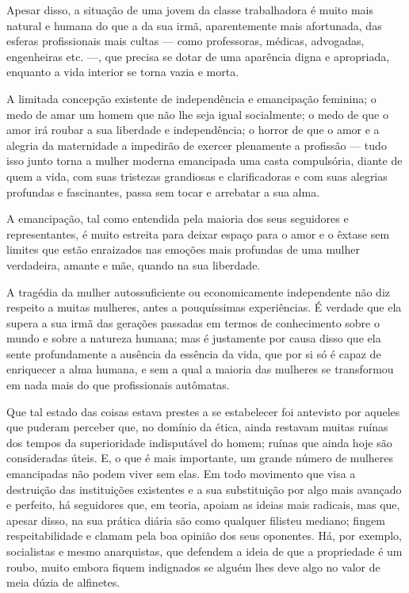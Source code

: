 Apesar disso, a situação de uma jovem da classe trabalhadora é muito
mais natural e humana do que a da sua irmã, aparentemente mais
afortunada, das esferas profissionais mais cultas --- como professoras, médicas, advogadas, engenheiras etc. ---,
que precisa se dotar de uma aparência digna e apropriada, enquanto a
vida interior se torna vazia e morta.

A limitada concepção existente de independência e emancipação feminina;
o medo de amar um homem que não lhe seja igual socialmente; o medo de
que o amor irá roubar a sua liberdade e independência; o horror de que o
amor e a alegria da maternidade a impedirão de exercer plenamente a
profissão --- tudo isso junto torna a mulher moderna emancipada uma casta
compulsória, diante de quem a vida, com suas tristezas grandiosas e
clarificadoras e com suas alegrias profundas e fascinantes, passa sem
tocar e arrebatar a sua alma.

A emancipação, tal como entendida pela maioria dos seus seguidores e
representantes, é muito estreita para deixar espaço para o amor e o
êxtase sem limites que estão enraizados nas emoções mais profundas de
uma mulher verdadeira, amante e mãe, quando na sua liberdade.

A tragédia da mulher autossuficiente ou economicamente independente não
diz respeito a muitas mulheres, antes a pouquíssimas experiências. É
verdade que ela supera a sua irmã das gerações passadas em termos de
conhecimento sobre o mundo e sobre a natureza humana; mas é justamente
por causa disso que ela sente profundamente a ausência da essência da
vida, que por si só é capaz de enriquecer a alma humana, e sem a qual a
maioria das mulheres se transformou em nada mais do que profissionais
autômatas.

Que tal estado das coisas estava prestes a se estabelecer foi antevisto
por aqueles que puderam perceber que, no domínio da ética, ainda
restavam muitas ruínas dos tempos da superioridade indisputável do
homem; ruínas que ainda hoje são consideradas úteis. E, o que é mais
importante, um grande número de mulheres emancipadas não podem viver sem
elas. Em todo movimento que visa a destruição das instituições
existentes e a sua substituição por algo mais avançado e perfeito, há
seguidores que, em teoria, apoiam as ideias mais radicais, mas que,
apesar disso, na sua prática diária são como qualquer filisteu mediano;
fingem respeitabilidade e clamam pela boa opinião dos seus oponentes.
Há, por exemplo, socialistas e mesmo anarquistas, que defendem a ideia
de que a propriedade é um roubo, muito embora fiquem indignados se
alguém lhes deve algo no valor de meia dúzia de alfinetes.

